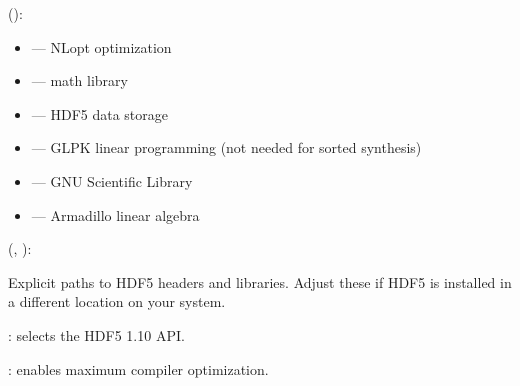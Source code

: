 \documentclass[a4paper,10pt,english]{sphinxmanual}
\begin{document}
\sphinxAtStartPar
{} ():
\begin{itemize}
\item {} 
\sphinxAtStartPar
{} — NLopt optimization

\item {} 
\sphinxAtStartPar
{} — math library

\item {} 
\sphinxAtStartPar
{} — HDF5 data storage

\item {} 
\sphinxAtStartPar
{} — GLPK linear programming (not needed for sorted synthesis)

\item {} 
\sphinxAtStartPar
{} — GNU Scientific Library

\item {} 
\sphinxAtStartPar
{} — Armadillo linear algebra

\end{itemize}

\sphinxAtStartPar
{} (, ):

\sphinxAtStartPar
Explicit paths to HDF5 headers and libraries. Adjust these if HDF5 is installed
in a different location on your system.

\sphinxAtStartPar
{}:  selects the HDF5 1.10 API.

\sphinxAtStartPar
{}:  enables maximum compiler optimization.
\end{document}
